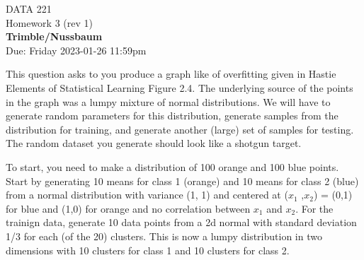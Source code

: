\documentclass[12pt]{book}
\theoremstyle{definition}
\begin{document}
\begin{center}
{\Large DATA 221 \\  Homework 3  (rev 1)}\\
\textbf{Trimble/Nussbaum}\\ %
Due: Friday 2023-01-26 11:59pm
\end{center}

\vspace{0.2 cm}

This question asks to you produce a graph like of overfitting given in Hastie Elements of Statistical Learning Figure 2.4.  The underlying source of the points in the graph was a lumpy mixture of normal distributions.  We will have to generate random parameters for this distribution, generate samples from the distribution for training, and generate another (large) set of samples for testing.  The random dataset you generate should look like a shotgun target.

To start, you need to make a distribution of 100 orange and 100 blue points.  Start by generating  10 means for class 1 (orange) and 10 means for class 2 (blue) from a normal distribution with variance (1, 1) and centered at ($x_1$ ,$x_2$) = (0,1) for blue and (1,0) for orange and no correlation between $x_1$ and $x_2$.   
For the trainign data, generate 10 data points from a 2d normal with standard deviation 1/3 for each (of the 20) clusters.  This is now a lumpy distribution in two dimensions with 10 clusters for class 1 and 10 clusters for class 2.

\end{document}

